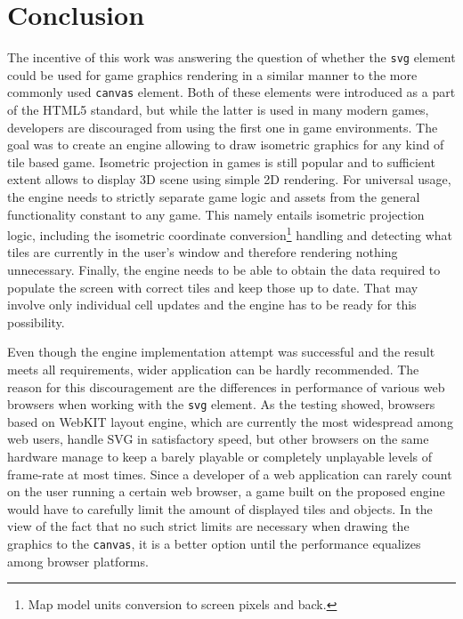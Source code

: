 \documentclass[11pt,oneside, final]{fithesis2}
\begin{document}
\chapter{Conclusion}
The incentive of this work was answering the question of whether the \texttt{svg} element could be used for game graphics rendering in a similar manner to the more commonly used \texttt{canvas} element. Both of these elements were introduced as a part of the HTML5 standard, but while the latter is used in many modern games, developers are discouraged from using the first one in game environments. The goal was to create an engine allowing to draw isometric graphics for any kind of tile based game. Isometric projection in games is still popular and to sufficient extent allows to display 3D scene using simple 2D rendering. For universal usage, the engine needs to strictly separate game logic and assets from the general functionality constant to any game. This namely entails isometric projection logic, including the isometric coordinate conversion\footnote{Map model units conversion to screen pixels and back.} handling and detecting what tiles are currently in the user's window and therefore rendering nothing unnecessary. Finally, the engine needs to be able to obtain the data required to populate the screen with correct tiles and keep those up to date. That may involve only individual cell updates and the engine has to be ready for this possibility.

Even though the engine implementation attempt was successful and the result meets all requirements, wider application can be hardly recommended. The reason for this discouragement are the differences in performance of various web browsers when working with the \texttt{svg} element. As the testing showed, browsers based on WebKIT layout engine, which are currently the most widespread among web users, handle SVG in satisfactory speed, but other browsers on the same hardware manage to keep a barely playable or completely unplayable levels of frame-rate at most times. Since a developer of a web application can rarely count on the user running a certain web browser, a game built on the proposed engine would have to carefully limit the amount of displayed tiles and objects. In the view of the fact that no such strict limits are necessary when drawing the graphics to the \texttt{canvas}, it is a better option until the performance equalizes among browser platforms.

\end{document}
